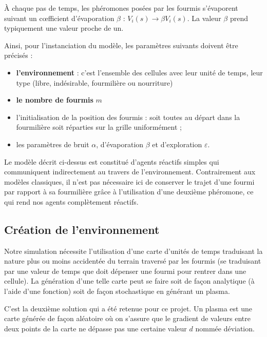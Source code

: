 \documentclass[a4]{article}
\begin{document}
À chaque pas de temps, les phéromones posées par les fourmis s'évaporent suivant un cœfficient d'évaporation $\beta$ :
$V_{i}(s) \rightarrow \beta V_{i}(s)$. La valeur $\beta$ prend typiquement une valeur proche de un. 

Ainsi, pour l'instanciation du modèle, les paramètres suivants doivent être précisés :
\begin{itemize}
\item \textbf{l'environnement} : c'est l'ensemble des cellules avec leur unité de temps, leur type (libre, indésirable, fourmilière ou nourriture)
\item \textbf{le nombre de fourmis} $m$
\item l'initialisation de la position des fourmis : soit toutes au départ dans la fourmilière soit réparties sur la grille uniformément ;
\item les paramètres de bruit $\alpha$, d'évaporation $\beta$ et d'exploration $\varepsilon$.
\end{itemize}

Le modèle décrit ci-dessus est constitué d'agents réactifs simples qui communiquent indirectement au travers de l'environnement. Contrairement aux modèles classiques, il n'est pas nécessaire ici de conserver le trajet d'une fourmi par rapport à sa fourmilière grâce à l'utilisation d'une deuxième phéromone, ce qui rend nos agents complètement réactifs.

\subsection{Création de l'environnement}


Notre simulation nécessite l'utilisation d'une carte d'unités de temps traduisant la nature plus ou moins accidentée du terrain traversé
par les fourmis (se traduisant par une valeur de temps que doit dépenser une fourmi pour rentrer dans une cellule). La génération d'une telle
carte peut se faire soit de façon analytique (à l'aide d'une fonction) soit de façon stochastique en générant un plasma.


C'est la deuxième solution qui a été retenue pour ce projet. Un plasma est une carte générée de façon aléatoire où on s'assure que
le gradient de valeurs entre deux points de la carte ne dépasse pas une certaine valeur $d$ nommée déviation.
\end{document}
